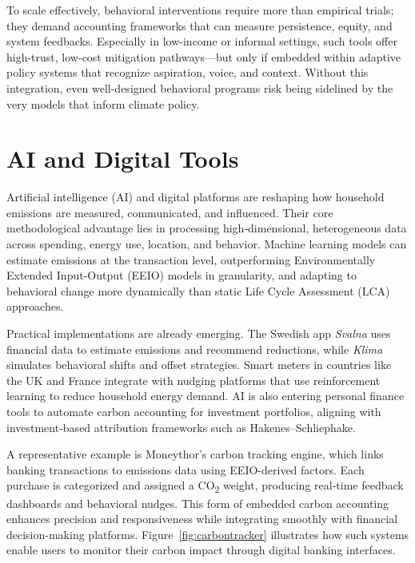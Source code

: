 \documentclass[12pt,a4paper]{article}%
\begin{document}
To scale effectively, behavioral interventions require more than empirical trials; they demand accounting frameworks that can measure persistence, equity, and system feedbacks. Especially in low-income or informal settings, such tools offer high-trust, low-cost mitigation pathways---but only if embedded within adaptive policy systems that recognize aspiration, voice, and context. Without this integration, even well-designed behavioral programs risk being sidelined by the very models that inform climate policy.

\section*{AI and Digital Tools}

Artificial intelligence (AI) and digital platforms are reshaping how household emissions are measured, communicated, and influenced. Their core methodological advantage lies in processing high-dimensional, heterogeneous data across spending, energy use, location, and behavior. Machine learning models can estimate emissions at the transaction level, outperforming Environmentally Extended Input-Output (EEIO) models in granularity, and adapting to behavioral change more dynamically than static Life Cycle Assessment (LCA) approaches.

Practical implementations are already emerging. The Swedish app \textit{Svalna} uses financial data to estimate emissions and recommend reductions, while \textit{Klima} simulates behavioral shifts and offset strategies. Smart meters in countries like the UK and France integrate with nudging platforms that use reinforcement learning to reduce household energy demand. AI is also entering personal finance tools to automate carbon accounting for investment portfolios, aligning with investment-based attribution frameworks such as Hakenes--Schliephake.

A representative example is Moneythor’s carbon tracking engine, which links banking transactions to emissions data using EEIO-derived factors. Each purchase is categorized and assigned a CO\textsubscript{2} weight, producing real-time feedback dashboards and behavioral nudges. This form of embedded carbon accounting enhances precision and responsiveness while integrating smoothly with financial decision-making platforms. Figure~\ref{fig:carbontracker} illustrates how such systems enable users to monitor their carbon impact through digital banking interfaces.
\end{document}
